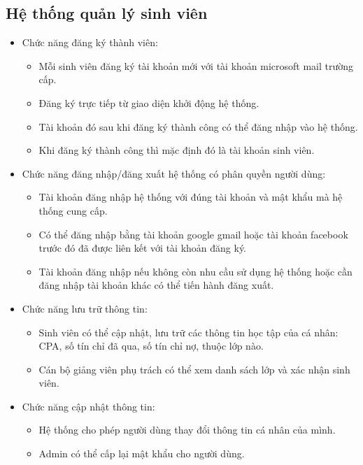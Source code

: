 \documentclass[12pt, a4paper]{report}
\begin{document}
    \subsection{Hệ thống quản lý sinh viên}
    \begin{itemize}
        \item Chức năng đăng ký thành viên:
        \begin{itemize}
            \item Mỗi sinh viên đăng ký tài khoản mới với tài khoản microsoft mail trường cấp.
            \item Đăng ký trực tiếp từ giao diện khởi động hệ thống.
            \item Tài khoản đó sau khi đăng ký thành công có thể đăng nhập vào hệ thống.
            \item Khi đăng ký thành công thì mặc định đó là tài khoản sinh viên.
        \end{itemize}
        \item Chức năng đăng nhập/đăng xuất hệ thống có phân quyền người dùng:
        \begin{itemize}
            \item Tài khoản đăng nhập hệ thống với đúng tài khoản và mật khẩu mà hệ thống cung cấp.
            \item Có thể đăng nhập bằng tài khoản google gmail hoặc tài khoản facebook trước đó đã được liên kết với tài khoản đăng ký.
            \item Tài khoản đăng nhập nếu không còn nhu cầu sử dụng hệ thống hoặc cần đăng nhập tài khoản khác có thể tiến hành đăng xuất.
        \end{itemize}
        \item Chức năng lưu trữ thông tin:
        \begin{itemize}
            \item Sinh viên có thể cập nhật, lưu trữ các thông tin học tập của cá nhân: CPA, số tín chỉ đã qua, số tín chỉ nợ, thuộc lớp nào.
            \item Cán bộ giảng viên phụ trách có thể xem danh sách lớp và xác nhận sinh viên.
        \end{itemize}
        \item Chức năng cập nhật thông tin:
        \begin{itemize}
            \item Hệ thống cho phép người dùng thay đổi thông tin cá nhân của mình.
            \item Admin có thể cấp lại mật khẩu cho người dùng.

\end{itemize}
\end{itemize}
\end{document}
